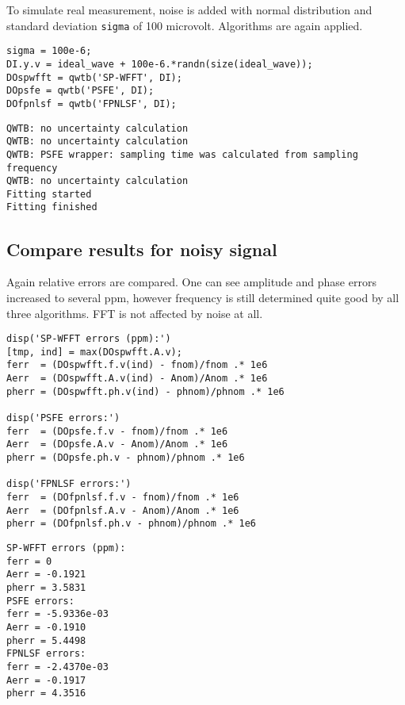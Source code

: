 To simulate real measurement, noise is added with normal distribution and
standard deviation \texttt{sigma} of 100 microvolt. Algorithms are again applied.

\begin{lstlisting}
sigma = 100e-6;
DI.y.v = ideal_wave + 100e-6.*randn(size(ideal_wave));
DOspwfft = qwtb('SP-WFFT', DI);
DOpsfe = qwtb('PSFE', DI);
DOfpnlsf = qwtb('FPNLSF', DI);
\end{lstlisting}
\begin{lstlisting}[language={},xleftmargin=5pt,frame=none]
QWTB: no uncertainty calculation
QWTB: no uncertainty calculation
QWTB: PSFE wrapper: sampling time was calculated from sampling frequency
QWTB: no uncertainty calculation
Fitting started
Fitting finished

\end{lstlisting}


{}
\subsection*{Compare results for noisy signal}



Again relative errors are compared. One can see amplitude and phase errors
increased to several ppm, however frequency is still determined quite good by
all three algorithms. FFT is not affected by noise at all.

\begin{lstlisting}
disp('SP-WFFT errors (ppm):')
[tmp, ind] = max(DOspwfft.A.v);
ferr  = (DOspwfft.f.v(ind) - fnom)/fnom .* 1e6
Aerr  = (DOspwfft.A.v(ind) - Anom)/Anom .* 1e6
pherr = (DOspwfft.ph.v(ind) - phnom)/phnom .* 1e6

disp('PSFE errors:')
ferr  = (DOpsfe.f.v - fnom)/fnom .* 1e6
Aerr  = (DOpsfe.A.v - Anom)/Anom .* 1e6
pherr = (DOpsfe.ph.v - phnom)/phnom .* 1e6

disp('FPNLSF errors:')
ferr  = (DOfpnlsf.f.v - fnom)/fnom .* 1e6
Aerr  = (DOfpnlsf.A.v - Anom)/Anom .* 1e6
pherr = (DOfpnlsf.ph.v - phnom)/phnom .* 1e6
\end{lstlisting}
\begin{lstlisting}[language={},xleftmargin=5pt,frame=none]
SP-WFFT errors (ppm):
ferr = 0
Aerr = -0.1921
pherr = 3.5831
PSFE errors:
ferr = -5.9336e-03
Aerr = -0.1910
pherr = 5.4498
FPNLSF errors:
ferr = -2.4370e-03
Aerr = -0.1917
pherr = 4.3516

\end{lstlisting}


